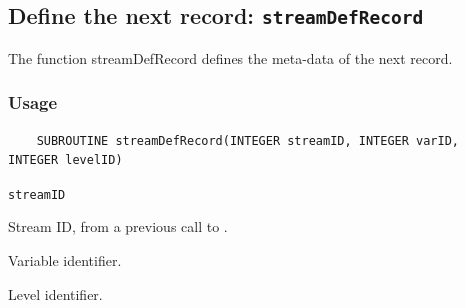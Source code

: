 

\subsection{Define the next record: {\tt streamDefRecord}}
\label{streamDefRecord}

The function streamDefRecord defines the meta-data of the next record.
\subsubsection*{Usage}

\begin{verbatim}
    SUBROUTINE streamDefRecord(INTEGER streamID, INTEGER varID, INTEGER levelID)
\end{verbatim}

\hspace*{4mm}\begin{minipage}[]{15cm}
\begin{deflist}{\tt streamID\ }
\item[{\tt streamID}]
Stream ID, from a previous call to {}.
\item[{\tt varID}]
Variable identifier.
\item[{\tt levelID}]
Level identifier.

\end{deflist}
\end{minipage}
